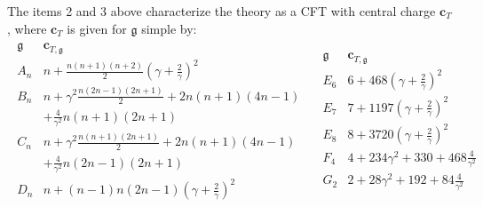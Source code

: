 \documentclass[10pt]{amsart}
\theoremstyle{definition}\newtheorem{defi}[theo]{Definition}\newtheorem{rema}[theo]{Remark}\newtheorem{exam}[theo]{Example}\newtheorem{exem}[theo]{Example}\newtheorem{nota}[theo]{Notation}
\newcommand{\frkg}{\mathfrak{g}}
\newcommand{\bfc}{\mathbf{c}}
\begin{document}
The items 2 and 3 above characterize the theory as a CFT with central charge $\bfc_T$, where $\bm c_T$ is given for $\frkg$ simple by:
\begin{multline}\label{central_charge}
\begin{array}{c|c}
\frkg & \bm c_{T,\frkg} \\
\hline A_{n}& n+\frac{n(n+1)(n+2)}2(\gamma+\frac2\gamma)^2 \\
B_n & n+ \gamma^2\frac{n(2n-1)(2n+1)}{2}+2n(n+1)(4n-1)\\
&+\frac{4}{\gamma^2}n(n+1)(2n+1)\\
C_n& n+\gamma^2\frac{n(n+1)(2n+1)}{2}+2n(n+1)(4n-1)\\
&+\frac{4}{\gamma^2}{n(2n-1)(2n+1)}\\
D_n& n+ (n-1)n(2n-1)(\gamma+\frac2\gamma)^2\\
\end{array}
\quad
\begin{array}{c|c}
\frkg & \bm c_{T,\frkg} \\
\hline E_6 & 6+468(\gamma+\frac2\gamma)^2\\
E_7 & 7+1197 (\gamma+\frac2\gamma)^2\\
E_8 & 8+3720 (\gamma+\frac2\gamma)^2\\
F_4 & 4+ 234\gamma^2+330+468\frac{4}{\gamma^2}\\
G_2 & 2+28\gamma^2+192+84\frac{4}{\gamma^2}\\
&
\end{array}
\end{multline}
\end{document}
